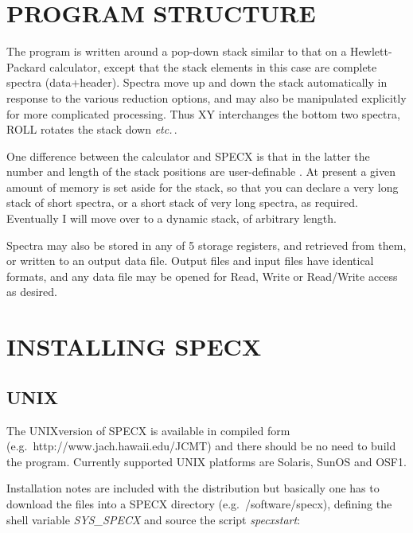 \documentclass[11pt,twoside]{report}
\newcommand{\etc}{{\it etc.\,}}
\begin{document}
\section{PROGRAM STRUCTURE}

The program is written around a pop-down stack similar to
that on a Hewlett-Packard
calculator, except that the stack
elements in this case are complete spectra (data+header). Spectra move
up and down the stack automatically in response to the various
reduction options, and may also be manipulated explicitly for more
complicated processing. Thus XY interchanges the
bottom two spectra, ROLL rotates the stack down
\etc.

One difference between the calculator and SPECX is that in the latter
the number and length of the stack positions are user-definable
. At present a given amount of memory is set 
aside for the stack, so that you can declare a very long stack of
short spectra, or a short stack of very long spectra, as
required. Eventually I will move over to a dynamic stack, of arbitrary
length.

Spectra may also be stored in any of 5 storage registers, and retrieved from them, or written to an output data file. Output
files and input files have identical formats, and any data file may be opened
for Read, Write or Read/Write access as desired. 

\section{INSTALLING SPECX}

\subsection{UNIX}

The UNIXversion of SPECX is available in compiled form 
(e.g.\ http://www.jach.hawaii.edu/JCMT) and there should be no need
to build the program. Currently supported UNIX platforms are
Solaris, SunOS and OSF1.

Installation notes are included with the distribution but basically
one has to download the files into a SPECX directory (e.g.\
/software/specx), defining the shell variable {\em SYS\_SPECX} and
source the script {\em specxstart}\index{startup file}:
\end{document}
